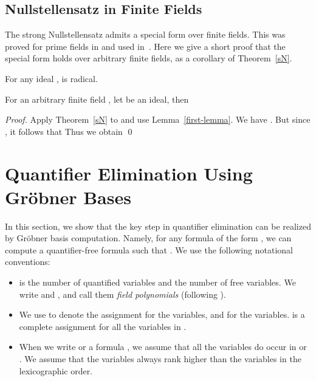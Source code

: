 \documentclass[envcountsect]{llncs}
\begin{document}
\subsection{Nullstellensatz in Finite Fields}

The strong Nullstellensatz admits a special form over finite fields. This was proved for prime fields in \cite{germ} and used in~\cite{poly,Marchand98onthe}. Here we give a short proof that the special form holds over arbitrary finite fields, as a corollary of Theorem~\ref{sN}.

\begin{lemma}\label{first-lemma}
For any ideal ,  is radical.
\end{lemma}

\begin{theorem}
\label{null}
For an arbitrary finite field , let  be an ideal,
then 
\end{theorem}
\begin{proof}
Apply Theorem~\ref{sN} to  and use Lemma~\ref{first-lemma}. We have 
.
But since , it follows that  Thus we obtain \qed
\end{proof}



\section{Quantifier Elimination Using Gr\"obner Bases}

In this section, we show that the key step in quantifier elimination can be realized by Gr\"obner basis computation. Namely, for any formula  of the form , we can compute a quantifier-free formula  such that . We use the following notational conventions:
\begin{itemize}
\item  is the number of quantified variables and  the number of free variables. We write  and , and call them {\em field polynomials} (following \cite{germ}).

\item We use  to denote the assignment for the  variables, and  for the  variables.  is a complete assignment for all the variables in .

\item When we write  or a formula , we assume that all the  variables do occur in  or . We assume that the  variables always rank higher than the  variables in the lexicographic order. 
\end{itemize}
\end{document}
